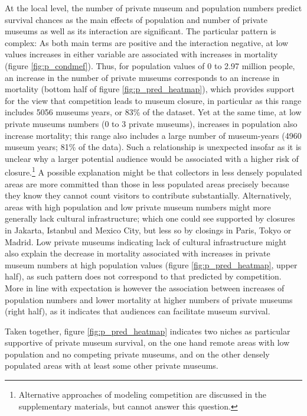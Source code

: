 \documentclass[12pt]{article}
\begin{document}
At the local level, the number of private museum and population numbers predict survival chances as the main effects of population and number of private museums as well as its interaction are significant.
The particular pattern is complex:
As both main terms are positive and the interaction negative, at low values increases in either variable are associated with increases in mortality (figure \ref{fig:p_condmef}).
Thus, for population values of 0 to 2.97 million people, an increase in the number of private museums corresponds to an increase in mortality (bottom half of figure \ref{fig:p_pred_heatmap}), which provides support for the view that competition leads to museum closure, in particular as this range includes 5056 museums years, or 83\% of the dataset. 
Yet at the same time, at low private museums numbers (0 to 3 private museums), increases in population also increase mortality; this range also includes a large number of museum-years (4960 museum years; 81\% of the data).
Such a relationship is unexpected insofar as it is unclear why a larger potential audience would be associated with a higher risk of closure.\footnote{Alternative approaches of modeling competition are discussed in the supplementary materials, but cannot answer this question.}
A possible explanation might be that collectors in less densely populated areas are more committed than those in less populated areas precisely because they know they cannot count visitors to contribute substantially.
Alternatively, areas with high population and low private museum numbers might more generally lack cultural infrastructure; which one could see supported by closures in Jakarta, Istanbul and Mexico City, but less so by closings in Paris, Tokyo or Madrid.
Low private museums indicating lack of cultural infrastructure might also explain the decrease in mortality associated with increases in private museum numbers at high population values (figure \ref{fig:p_pred_heatmap}, upper half), as such pattern does not correspond to that predicted by competition.
More in line with expectation is however the association between increases of population numbers and lower mortality at higher numbers of private museums (right half), as it indicates that audiences can facilitate museum survival.


Taken together, figure \ref{fig:p_pred_heatmap} indicates two niches as particular supportive of private museum survival, on the one hand remote areas with low population and no competing private museums, and on the other densely populated areas with at least some other private museums.
\end{document}
